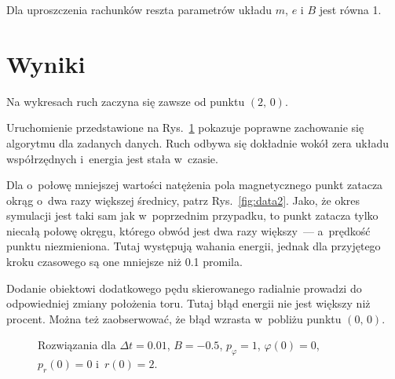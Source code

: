 \documentclass[a4paper; 12pt]{article}
\begin{document}
Dla uproszczenia rachunków reszta parametrów układu $m$, $e$ i $B$ jest równa \num{1}.

\section{Wyniki}

Na wykresach ruch zaczyna się zawsze od punktu $(2,\,0)$.

Uruchomienie przedstawione na Rys.~\ref{fig:data1} pokazuje poprawne zachowanie
się algorytmu dla zadanych danych.
Ruch odbywa się dokładnie wokół zera układu współrzędnych i~energia jest stała
w~czasie.

Dla o~połowę mniejszej wartości natężenia pola magnetycznego punkt zatacza
okrąg o~dwa razy większej średnicy, patrz Rys.~\ref{fig:data2}.
Jako, że okres symulacji jest taki sam jak w~poprzednim przypadku, to punkt
zatacza tylko niecałą połowę okręgu, którego obwód jest dwa razy większy~---
a~prędkość punktu niezmieniona.
Tutaj występują wahania energii, jednak dla przyjętego kroku czasowego są one
mniejsze niż \num{0.1} promila.

Dodanie obiektowi dodatkowego pędu skierowanego radialnie prowadzi do
odpowiedniej zmiany położenia toru.
Tutaj błąd energii nie jest większy niż procent.
Można też zaobserwować, że błąd wzrasta w~pobliżu punktu $(0,\,0)$.

\begin{figure}
    \centering
    \caption{Rozwiązania dla $\Delta t=\num{0.01}$, $B=\num{-0.5}$,
        $p_\varphi=\num{1}$, $\varphi(0)=\num{0}$, $p_r(0)=\num{0}$
        i~$r(0)=\num{2}$.}
    \label{fig:data1}
\end{figure}
\end{document}
